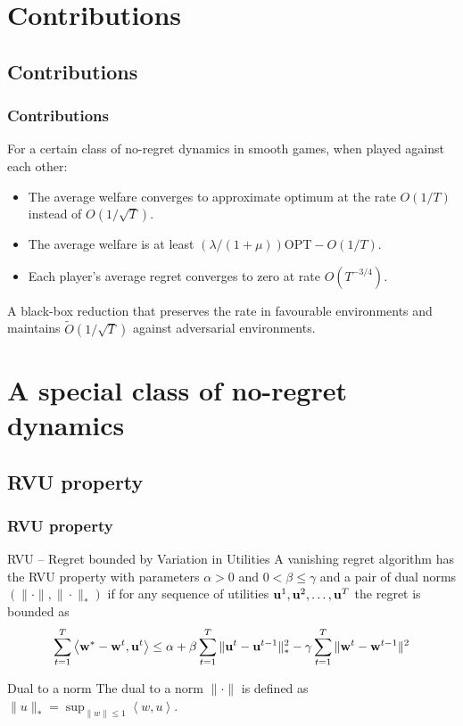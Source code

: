 \documentclass{beamer}
\renewcommand{\vec}[1]{\ensuremath{{\bf #1}}}
\newcommand{\dotp}[2]{\ensuremath{\left\langle #1, #2 \right\rangle}}
\begin{document}
\section{Contributions}
\subsection{Contributions}
\begin{frame}
	\frametitle{Contributions}
	For a certain class of no-regret dynamics in smooth games, when played against each other:
	\begin{itemize}
		\item\alert<3>{ The average welfare converges to approximate optimum at the rate $O(1/T)$ instead of $O(1/\sqrt{T})$.}
		\item The average welfare is at least $ (\lambda / (1 + \mu)) \text{OPT} - O(1/T) $.
		\item Each player's average regret converges to zero at rate $O(T^{-3/4})$.
	\end{itemize}\pause
	A black-box reduction that preserves the rate in favourable environments and maintains $\tilde{O}(1/\sqrt{T})$ against adversarial environments.
\end{frame}




\section[A class of no-regret dynamics]{A special class of no-regret dynamics}
\subsection{RVU property}

\begin{frame}
	\frametitle{RVU property}
	\begin{block}{RVU -- Regret bounded by Variation in Utilities}
		A vanishing regret algorithm has the RVU property with parameters $\alpha>0$ and $0<\beta\leq\gamma$ and a pair of dual norms $(\|\cdot\|, \|\cdot\|_*)$ if for any sequence of utilities $\vec{u}^1, \vec{u}^2, \ldots, \vec{u}^T$ the regret is bounded as 
		\begin{equation*}
		\sum_{t=1}^{T} \dotp{\vec{w}^*- \vec{w}^t}{\vec{u}^t} \leq \alpha
		+\beta \sum_{t=1}^{T} \| \vec{u}^t - \vec{u}^{t-1}\|_*^2 -
		\gamma\sum_{t=1}^{T} \|\vec{w}^{t} - \vec{w}^{t-1}\|^2
		\end{equation*}  
	\end{block}
	
	\begin{block}{Dual to a norm}
		The dual to a norm
		$\|\cdot\|$ is defined as $\|u\|_* = \sup_{\|w\| \leq 1}
		\dotp{w}{u}$.
	\end{block}
\end{frame}
\end{document}

